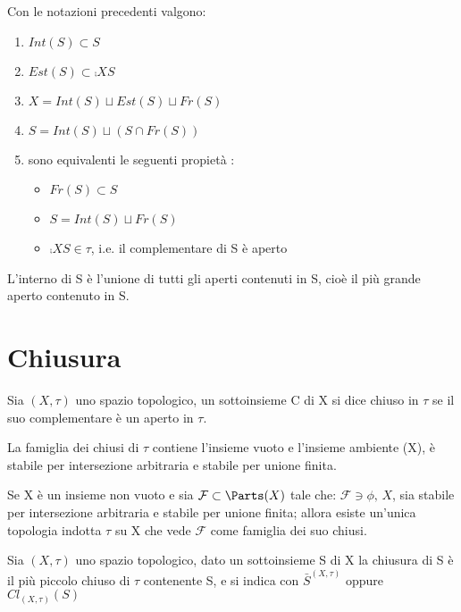 \documentclass[a4paper]{article}
\begin{document}
\begin{osss} Con le notazioni precedenti valgono:
\begin{enumerate} 
	\item $ Int(S) \subset S $
	\item $Est(S) \subset \comp{X} S $
	\item $X=Int(S) \sqcup Est(S) \sqcup Fr(S) $
	\item $ S= Int(S) \sqcup ( S \cap Fr(S) ) $
	\item sono equivalenti le seguenti propietà : 
	\begin{itemize}
		\item $Fr(S) \subset S $
		\item $S = Int(S) \sqcup Fr(S) $ 
		\item $\comp{X} S \in \tau $, i.e. il complementare di S è aperto
	\end{itemize}
\end{enumerate}
\end{osss}

\begin{lem} L'interno di S è l'unione di tutti gli aperti contenuti in S, cioè il più grande aperto contenuto in S.
\end{lem}

\section{Chiusura}

\begin{deff}
Sia $(X, \tau )$ uno spazio topologico, un sottoinsieme C di X si dice chiuso in $\tau $ se il suo complementare è un aperto in $\tau $.
\end{deff}

\begin{oss} La famiglia dei chiusi di $\tau $ contiene l'insieme vuoto e l'insieme ambiente (X), è stabile per intersezione arbitraria e stabile per unione finita.
\end{oss}

\begin{lem} Se X è un insieme non vuoto e sia $\mathcal{F} \subset \Parts (X) $ tale che: $\mathcal{F} \ni \phi ,\, X$, sia stabile per intersezione arbitraria e stabile per unione finita; allora esiste un'unica topologia indotta $\tau $ su X che vede $\mathcal{F} $ come famiglia dei suo chiusi.
\end{lem}

\begin{deff}
Sia $(X, \tau )$ uno spazio topologico, dato un sottoinsieme S di X la chiusura di S è il più piccolo chiuso di $\tau $ contenente S, e si indica con $\bar{S} ^ {(X,\tau )} $ oppure $ Cl_{(X, \tau )} (S)$
\end{deff}
\end{document}
